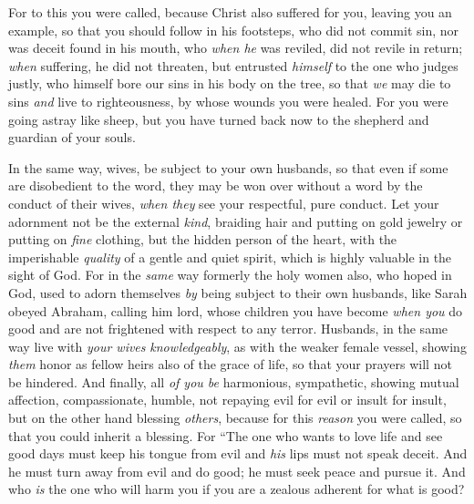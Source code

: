 \begin{biblechapter}
\verse For to this you were called, because Christ also suffered for you, leaving you an example, so that you should follow in his footsteps,
\verse who did not commit sin, nor was deceit found in his mouth,
\verse who \textit{when he} was reviled, did not revile in return; \textit{when} suffering, he did not threaten, but entrusted \textit{himself} to the one who judges justly,
\verse who himself bore our sins in his body on the tree, so that \textit{we} may die to sins \textit{and} live to righteousness, by whose wounds you were healed.
\verse For you were going astray like sheep, but you have turned back now to the shepherd and guardian of your souls.
\end{biblechapter}

\begin{biblechapter} %
 In the same way, wives, be subject to your own husbands, so that even if some are disobedient to the word, they may be won over without a word by the conduct of their wives,
\verse \textit{when they} see your respectful, pure conduct.
\verse Let your adornment not be the external \textit{kind}, braiding hair and putting on gold jewelry or putting on \textit{fine} clothing,
\verse but the hidden person of the heart, with the imperishable \textit{quality} of a gentle and quiet spirit, which is highly valuable in the sight of God.
\verse For in the \textit{same} way formerly the holy women also, who hoped in God, used to adorn themselves \textit{by} being subject to their own husbands,
\verse like Sarah obeyed Abraham, calling him lord, whose children you have become \textit{when you} do good and are not frightened with respect to any terror.
\verse Husbands, in the same way live with \textit{your wives} \textit{knowledgeably}, as with the weaker female vessel, showing \textit{them} honor as fellow heirs also of the grace of life, so that your prayers will not be hindered.
 And finally, all \textit{of you be} harmonious, sympathetic, showing mutual affection, compassionate, humble,
\verse not repaying evil for evil or insult for insult, but on the other hand blessing \textit{others}, because for this \textit{reason} you were called, so that you could inherit a blessing.
\verse For
\verse “The one who wants to love life 
and see good days 
must keep his tongue from evil 
and \textit{his} lips must not speak deceit.
\verse And he must turn away from evil and do good; 
he must seek peace and pursue it.
 And who \textit{is} the one who will harm you if you are a zealous adherent for what is good?

\end{biblechapter}

